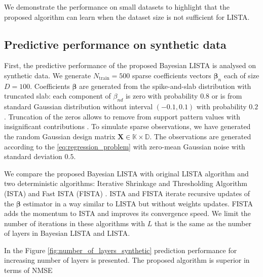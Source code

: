 \documentclass[letterpaper]{article}
\begin{document}
We demonstrate the performance on small datasets to highlight that the proposed algorithm can learn when the dataset size is not sufficient for LISTA.

\subsection{Predictive performance on synthetic data}
First, the predictive performance of the proposed Bayesian LISTA is analysed on synthetic data. We generate $N_\text{train}=500$ sparse coefficients vectors $\boldsymbol\beta_n$ each of size $D = 100$. Coefficients $\boldsymbol\beta$ are generated from the spike-and-slab distribution with truncated slab: each component of $\beta_{nd}$ is zero with probability $0.8$ or is from standard Gaussian distribution without interval $(-0.1, 0.1)$ with probability $0.2$. Truncation of the zeros allows to remove from support pattern values with insignificant contributions \cite{xin2016maximal}. To simulate sparse observations, we have generated the random Gaussian design matrix $\mathbf{X} \in \mathbb{K \times D}$.  The observations are generated according to the \ref{eq:regression_problem} with zero-mean Gaussian noise with standard deviation $0.5$. 

We compare the proposed Bayesian LISTA with original LISTA algorithm \cite{gregor2010learning} and two deterministic algorithms: Iterative Shrinkage and Thresholding Algorithm (ISTA) \cite{daubechies2004iterative} and Fast ISTA (FISTA) \cite{beck2009fast}. ISTA and FISTA iterate recursive updates of the $\boldsymbol\beta$ estimator in a way similar to LISTA but without weights updates.  FISTA adds the momentum to ISTA and improves its convergence speed. We limit the number of iterations in these algorithms with $L$ that is the same as the number of layers in Bayesian LISTA and LISTA.

In the Figure \ref{fig:number_of_layers_synthetic} prediction performance for increasing number of layers is presented. The proposed algorithm is superior in terms of NMSE
\end{document}
